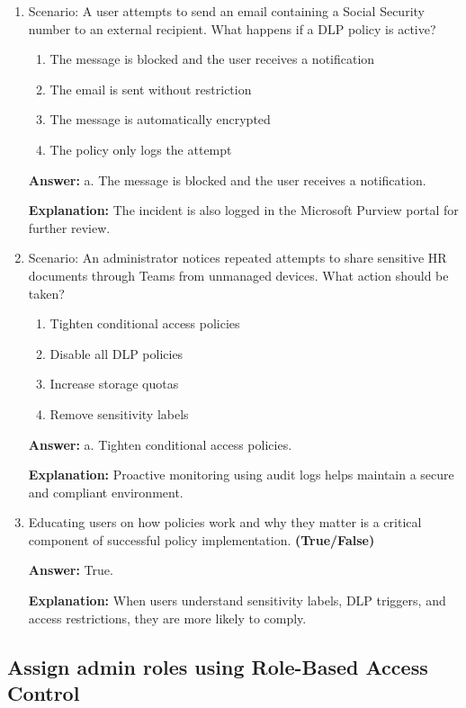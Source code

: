 \documentclass[10pt]{article}
\begin{document}
\begin{enumerate}[leftmargin=*]
\item Scenario: A user attempts to send an email containing a Social Security number to an external recipient. What happens if a DLP policy is active?
\begin{enumerate}[label=\alph*., leftmargin=1.5em]
\item The message is blocked and the user receives a notification
\item The email is sent without restriction
\item The message is automatically encrypted
\item The policy only logs the attempt
\end{enumerate}
\textbf{Answer:} a. The message is blocked and the user receives a notification.

\textbf{Explanation:} The incident is also logged in the Microsoft Purview portal for further review.

\item Scenario: An administrator notices repeated attempts to share sensitive HR documents through Teams from unmanaged devices. What action should be taken?
\begin{enumerate}[label=\alph*., leftmargin=1.5em]
\item Tighten conditional access policies
\item Disable all DLP policies
\item Increase storage quotas
\item Remove sensitivity labels
\end{enumerate}
\textbf{Answer:} a. Tighten conditional access policies.

\textbf{Explanation:} Proactive monitoring using audit logs helps maintain a secure and compliant environment.

\item Educating users on how policies work and why they matter is a critical component of successful policy implementation. \textbf{(True/False)}

\textbf{Answer:} True.

\textbf{Explanation:} When users understand sensitivity labels, DLP triggers, and access restrictions, they are more likely to comply.

\end{enumerate}
\clearpage

\subsection{Assign admin roles using Role-Based Access Control}
\end{document}
